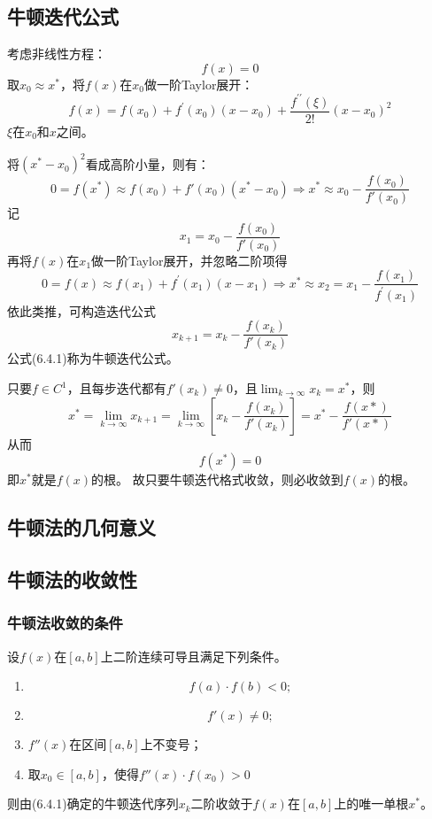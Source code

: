 \subsection{牛顿迭代公式}
考虑非线性方程：
\begin{equation*}
    f(x) = 0
\end{equation*}
取$x_0 \approx x^*$，将$f(x)$在$x_0$做一阶Taylor展开：
\begin{equation*}
    f(x)=f(x_0)+f^{\prime}(x_0)(x-x_0)+\frac{f^{\prime\prime}(\xi)}{2!}(x-x_0)^2
\end{equation*}
$\xi$在$x_0$和$x$之间。

将$(x^*-x_0)^2$看成高阶小量，则有：
\begin{equation*}
    0 = f(x^*) \approx f(x_0)+f'(x_0)(x^*-x_0) \Rightarrow x^* \approx x_0-\frac{f(x_0)}{f'(x_0)}
\end{equation*}
记
\[x_1 = x_0-\frac{f(x_0)}{f'(x_0)}\]
再将$f(x)$在$x_1$做一阶Taylor展开，并忽略二阶项得
\[0=f(x)\approx f(x_1)+f^{\prime}(x_1)(x-x_1)\Longrightarrow x^*\approx x_2=x_1-\frac{f(x_1)}{f^{\prime}(x_1)}\]
依此类推，可构造迭代公式
\begin{equation}
    x_{k+1}=x_k-\frac{f(x_k)}{f'(x_k)}
\end{equation}
公式(6.4.1)称为牛顿迭代公式。

只要$f \in C^1$，且每步迭代都有$f'(x_k) \neq 0$，且$\lim_{k\to\infty}x_k=x^*$，则
\[x^{*}\underset{}{\operatorname*{=}}\lim\limits_{k\to\infty}x_{k+1}=\underset{k\to\infty}{\operatorname*{\lim}}\left[x_{k}-\frac{f(x_k)}{f'(x_k)}\right]=x^{*}-\frac{f(x*)}{f'(x*)}\]
从而
\[f(x^*) = 0\]
即$x^*$就是$f(x)$的根。
故只要牛顿迭代格式收敛，则必收敛到$f(x)$的根。

\subsection{牛顿法的几何意义}

\subsection{牛顿法的收敛性}

\subsubsection{牛顿法收敛的条件}
\begin{theorem}
    设$f(x)$在$[a,b]$上二阶连续可导且满足下列条件。
    \begin{enumerate}
        \item \[f(a) \cdot f(b) < 0;\]
        \item \[f'(x) \neq 0;\]
        \item $f''(x)$在区间$[a,b]$上不变号；
        \item 取$x_0 \in[a,b]$，使得$f''(x)\cdot f(x_0)>0$
    \end{enumerate}
    则由(6.4.1)确定的牛顿迭代序列${x_k}$二阶收敛于$f(x)$在$[a,b]$上的唯一单根$x^*$。
\end{theorem}

